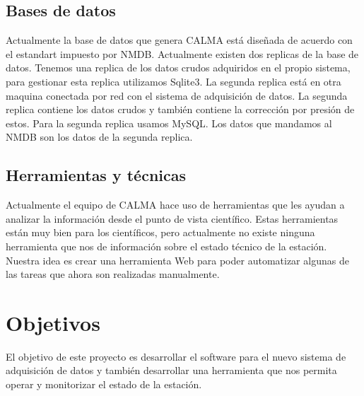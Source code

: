 	\subsection{Bases de datos}
		Actualmente la base de datos que genera CALMA está diseñada de acuerdo con el estandart impuesto por NMDB. Actualmente existen dos replicas
		de la base de datos. Tenemos una replica de los datos crudos adquiridos en el propio sistema, para gestionar esta replica utilizamos Sqlite3. La
		segunda replica está en otra maquina conectada por red con el sistema de adquisición de datos. La segunda replica contiene los datos crudos y 
		también contiene la corrección por presión de estos. Para la segunda replica usamos MySQL. Los datos que mandamos al NMDB son los datos de la 
		segunda replica.
	\subsection{Herramientas y técnicas}
		Actualmente el equipo de CALMA hace uso de herramientas que les ayudan a analizar la información desde el punto de vista científico. Estas 
		herramientas están muy bien para los científicos, pero actualmente no existe ninguna herramienta que nos de información sobre el estado técnico 
		de la estación. Nuestra idea es crear una herramienta Web para poder automatizar algunas de las tareas que ahora son realizadas manualmente. 


\section{Objetivos}
	El objetivo de este proyecto es desarrollar el software para el nuevo sistema de adquisición de datos y también desarrollar una herramienta
	que nos permita operar y monitorizar el estado de la estación. 
